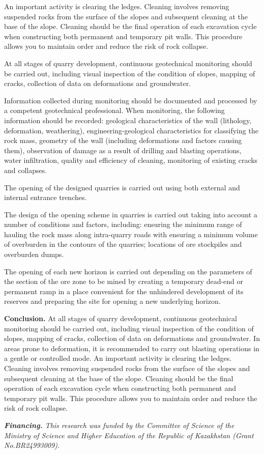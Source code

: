 \begin{multicols}{2}
An important activity is clearing the ledges. Cleaning involves removing
suspended rocks from the surface of the slopes and subsequent cleaning
at the base of the slope. Cleaning should be the final operation of each
excavation cycle when constructing both permanent and temporary pit
walls. This procedure allows you to maintain order and reduce the risk
of rock collapse.

At all stages of quarry development, continuous geotechnical monitoring
should be carried out, including visual inspection of the condition of
slopes, mapping of cracks, collection of data on deformations and
groundwater.

Information collected during monitoring should be documented and
processed by a competent geotechnical professional. When monitoring, the
following information should be recorded: geological characteristics of
the wall (lithology, deformation, weathering), engineering-geological
characteristics for classifying the rock mass, geometry of the wall
(including deformations and factors causing them), observation of damage
as a result of drilling and blasting operations, water infiltration,
quality and efficiency of cleaning, monitoring of existing cracks and
collapses.

The opening of the designed quarries is carried out using both external
and internal entrance trenches.

The design of the opening scheme in quarries is carried out taking into
account a number of conditions and factors, including: ensuring the
minimum range of hauling the rock mass along intra-quarry roads with
ensuring a minimum volume of overburden in the contours of the quarries;
locations of ore stockpiles and overburden dumps.

The opening of each new horizon is carried out depending on the
parameters of the section of the ore zone to be mined by creating a
temporary dead-end or permanent ramp in a place convenient for the
unhindered development of its reserves and preparing the site for
opening a new underlying horizon.

{\bfseries Conclusion.} At all stages of quarry development, continuous
geotechnical monitoring should be carried out, including visual
inspection of the condition of slopes, mapping of cracks, collection of
data on deformations and groundwater. In areas prone to deformation, it
is recommended to carry out blasting operations in a gentle or
controlled mode. An important activity is clearing the ledges. Cleaning
involves removing suspended rocks from the surface of the slopes and
subsequent cleaning at the base of the slope. Cleaning should be the
final operation of each excavation cycle when constructing both
permanent and temporary pit walls. This procedure allows you to maintain
order and reduce the risk of rock collapse.

\emph{{\bfseries Financing.} This research was funded by the Committee of
Science of the Ministry of Science and Higher Education of the Republic
of Kazakhstan (Grant No.BR24993009).}
\end{multicols}

